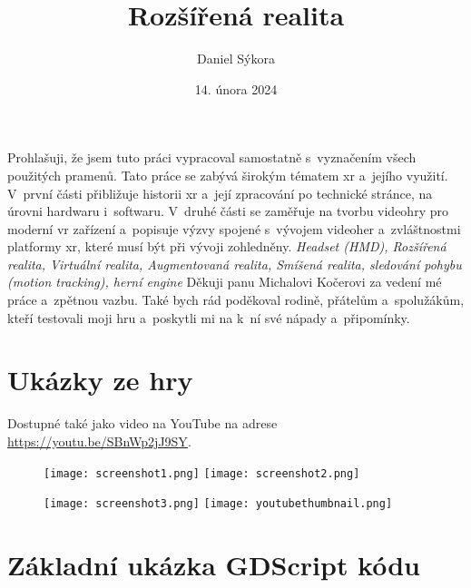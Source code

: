 \documentclass[12pt]{report}
\author{Daniel Sýkora}
\title{Rozšířená realita}
\date{14. února 2024}
\begin{document}
\mytitlepage
\prohlaseni
{
	Prohlašuji, že jsem tuto práci vypracoval samostatně s~vyznačením všech použitých pramenů.
}
\abstrakt
{ %
	Tato práce se zabývá širokým tématem \gls{xr} a~jejího využití. V~první části přibližuje historii \gls{xr} a~její zpracování po technické stránce, na úrovni hardwaru i~softwaru. V~druhé části se zaměřuje na tvorbu videohry pro moderní \gls{vr} zařízení a~popisuje výzvy spojené s~vývojem videoher a~zvláštnostmi platformy \gls{xr}, které musí být při vývoji zohledněny.
}
{ %
	\textit{Headset (HMD), Rozšířená realita, Virtuální realita, Augmentovaná realita, Smíšená realita, sledování pohybu (motion tracking), herní engine}
}
\podekovani
{
	Děkuji panu Michalovi Kočerovi za vedení mé práce a~zpětnou vazbu. Také bych rád poděkoval rodině, přátelům a~spolužákům, kteří testovali moji hru a~poskytli mi na k~ní své nápady a~připomínky.
}

\tableofcontents
\newpage






\nocite{*}

\printbibliography

\printglossary[title={Zkratky}]

\listoffigures
{}

\appendix

\chapter{Ukázky ze hry}\label{apx_screenshots}
Dostupné také jako video na YouTube na adrese \url{https://youtu.be/SBnWp2jJ9SY}.
\begin{figure}[H]
	\centering
	\texttt{[image: screenshot1.png]}
	\texttt{[image: screenshot2.png]}
\end{figure}
\begin{figure}[H]
	\centering
	\texttt{[image: screenshot3.png]}
	\texttt{[image: youtubethumbnail.png]}
\end{figure}

\chapter{Základní ukázka GDScript kódu}\label{apx_gscript_sample}

\end{document}
